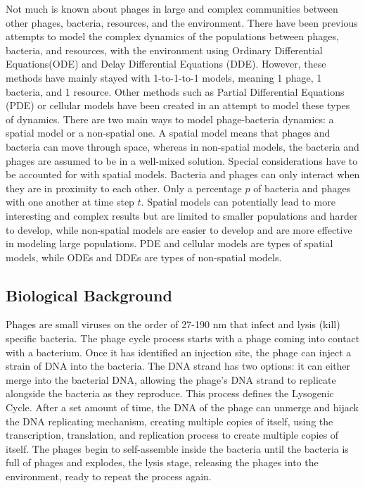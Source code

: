 Not much is known about phages in large and complex communities between other phages, bacteria, resources, and the environment. There have been previous attempts to model the complex dynamics of the populations between phages, bacteria, and resources, with the environment using Ordinary Differential Equations(ODE) and Delay Differential Equations (DDE). However, these methods have mainly stayed with 1-to-1-to-1 models, meaning 1 phage, 1 bacteria, and 1 resource. Other methods such as Partial Differential Equations (PDE) or cellular models have been created in an attempt to model these types of dynamics. There are two main ways to model phage-bacteria dynamics: a spatial model or a non-spatial one. A spatial model means that phages and bacteria can move through space, whereas in non-spatial models, the bacteria and phages are assumed to be in a well-mixed solution. Special considerations have to be accounted for with spatial models. Bacteria and phages can only interact when they are in proximity to each other. Only a percentage $p$ of bacteria and phages with one another at time step $t$. Spatial models can potentially lead to more interesting and complex results but are limited to smaller populations and harder to develop, while non-spatial models are easier to develop and are more effective in modeling large populations. PDE and cellular models are types of spatial models, while ODEs and DDEs are types of non-spatial models. \newline 


\subsection{Biological Background}
Phages are small viruses on the order of 27-190 nm that infect and lysis (kill) specific bacteria. The phage cycle process starts with a phage coming into contact with a bacterium. Once it has identified an injection site, the phage can inject a strain of DNA into the bacteria. The DNA strand has two options: it can either merge into the bacterial DNA, allowing the phage's DNA strand to replicate alongside the bacteria as they reproduce. This process defines the Lysogenic Cycle. After a set amount of time, the DNA of the phage can unmerge and hijack the DNA replicating mechanism, creating multiple copies of itself, using the transcription, translation, and replication process to create multiple copies of itself. The phages begin to self-assemble inside the bacteria until the bacteria is full of phages and explodes, the lysis stage, releasing the phages into the environment, ready to repeat the process again. 

